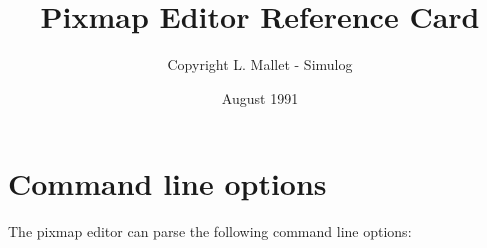 \newcommand{\PAGESIZE}[2]
        {
                \textheight #1
                \textwidth #2
        }
 \newcommand{\MARGINS}[3]
        {
                \topmargin #1
                \oddsidemargin #2
                \evensidemargin #3
        }
\PAGESIZE{21.5cm}{16cm}
\MARGINS{-10mm}{0mm}{0mm}
\footskip 20mm

\title{Pixmap Editor Reference Card}
\author{Copyright L. Mallet - Simulog}
\date{August 1991}
 
\maketitle
\section{Command line options}

The pixmap editor can parse the following command line options:\\

